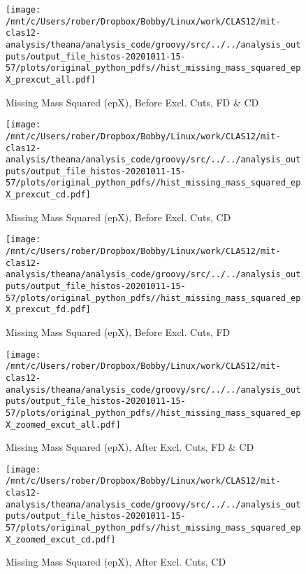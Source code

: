 \documentclass{article}
\begin{document}
\begin{landscape}
\begin{figure}[h]
        \texttt{[image: /mnt/c/Users/rober/Dropbox/Bobby/Linux/work/CLAS12/mit-clas12-analysis/theana/analysis\_code/groovy/src/../../analysis\_outputs/output\_file\_histos-20201011-15-57/plots/original\_python\_pdfs//hist\_missing\_mass\_squared\_epX\_prexcut\_all.pdf]}
        \captionsetup{textformat=empty,labelformat=blank}
        \caption{Missing Mass Squared (epX), Before Excl. Cuts, FD \& CD}
    \end{figure}
    \clearpage
    
    \begin{figure}[h]
        \centering

        \texttt{[image: /mnt/c/Users/rober/Dropbox/Bobby/Linux/work/CLAS12/mit-clas12-analysis/theana/analysis\_code/groovy/src/../../analysis\_outputs/output\_file\_histos-20201011-15-57/plots/original\_python\_pdfs//hist\_missing\_mass\_squared\_epX\_prexcut\_cd.pdf]}
        \captionsetup{textformat=empty,labelformat=blank}
        \caption{Missing Mass Squared (epX), Before Excl. Cuts, CD}
    \end{figure}
    \clearpage
    
    \begin{figure}[h]
        \centering

        \texttt{[image: /mnt/c/Users/rober/Dropbox/Bobby/Linux/work/CLAS12/mit-clas12-analysis/theana/analysis\_code/groovy/src/../../analysis\_outputs/output\_file\_histos-20201011-15-57/plots/original\_python\_pdfs//hist\_missing\_mass\_squared\_epX\_prexcut\_fd.pdf]}
        \captionsetup{textformat=empty,labelformat=blank}
        \caption{Missing Mass Squared (epX), Before Excl. Cuts, FD}
    \end{figure}
    \clearpage
    
    \begin{figure}[h]
        \centering

        \texttt{[image: /mnt/c/Users/rober/Dropbox/Bobby/Linux/work/CLAS12/mit-clas12-analysis/theana/analysis\_code/groovy/src/../../analysis\_outputs/output\_file\_histos-20201011-15-57/plots/original\_python\_pdfs//hist\_missing\_mass\_squared\_epX\_zoomed\_excut\_all.pdf]}
        \captionsetup{textformat=empty,labelformat=blank}
        \caption{Missing Mass Squared (epX), After Excl. Cuts, FD \& CD}
    \end{figure}
    \clearpage
    
    \begin{figure}[h]
        \centering

        \texttt{[image: /mnt/c/Users/rober/Dropbox/Bobby/Linux/work/CLAS12/mit-clas12-analysis/theana/analysis\_code/groovy/src/../../analysis\_outputs/output\_file\_histos-20201011-15-57/plots/original\_python\_pdfs//hist\_missing\_mass\_squared\_epX\_zoomed\_excut\_cd.pdf]}
        \captionsetup{textformat=empty,labelformat=blank}
        \caption{Missing Mass Squared (epX), After Excl. Cuts, CD}
    \end{figure}
    \clearpage
    

\end{landscape}
\end{document}
